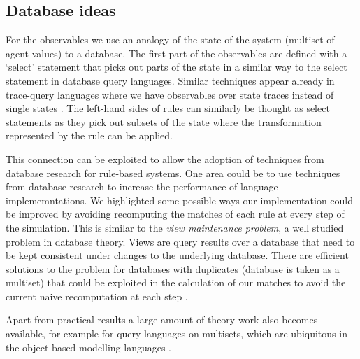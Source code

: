 \documentclass[phd]{infthesis}
\begin{document}
\subsection{Database ideas}
For the observables we use an analogy of the state of the system (multiset of
agent values) to a database. The first part of the observables are defined with
a `select' statement that picks out parts of the state in a similar way to the
select statement in database query languages. Similar techniques appear already
in trace-query languages where we have observables over state traces instead of
single states \citep{laurent_trace_2018}. The left-hand sides of rules can
similarly be thought as select statements as they pick out subsets of the state
where the transformation represented by the rule can be applied.

This connection can be exploited to allow the adoption of techniques from
database research for rule-based systems. One area could be to use techniques
from database research to increase the performance of language
implememntations. We highlighted some possible ways our implementation could be
improved by avoiding recomputing the matches of each rule at every step of the
simulation. This is similar to the \emph{view maintenance problem}, a well
studied problem in database theory. Views are query results over a database that
need to be kept consistent under changes to the underlying database. There are
efficient solutions to the problem for databases with duplicates (database is
taken as a multiset) that could be exploited in the calculation of our matches
to avoid the current naive recomputation at each step
\citep{griffin_incremental_1995}.

Apart from practical results a large amount of theory work also becomes
available, for example for query languages on multisets, which are ubiquitous in
the object-based modelling languages \citep{libkin_query_1997,
  buneman_comprehension_1994}.




\end{document}
